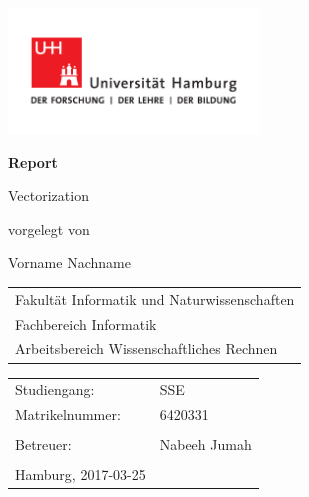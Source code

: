 \documentclass[
	12pt,
	a4paper,
	BCOR10mm,
	DIV14,
	headsepline,
	usegeometry,
]{scrreprt}
\begin{document}

\begin{titlepage}
	\includegraphics[width=0.5\textwidth]{UHH-Logo_2010_Farbe_CMYK}

	\begin{center}
		{\Large \textcolor{uhhred}{\textbf{Report}}\par}

		\vspace{1cm}

		{\titlefont\huge Vectorization \par}

		\vspace{1cm}

		{\large vorgelegt von\par}

		\vspace{0.5cm}

		{\large Vorname Nachname\par}
	\end{center}

	\vfill

	{\large\noindent\begin{tabular}{l}
		Fakultät Informatik und Naturwissenschaften\\
		Fachbereich Informatik\\
		Arbeitsbereich Wissenschaftliches Rechnen
	\end{tabular}\par}

	\vspace{1cm}

	{\large\noindent\begin{tabular}{ll}
		Studiengang:    &  SSE\\
		Matrikelnummer: & 6420331\\
		\\
		Betreuer:       & Nabeeh Jumah \\
		\\
		Hamburg, 2017-03-25
	\end{tabular}\par}
\end{titlepage}
\end{document}
